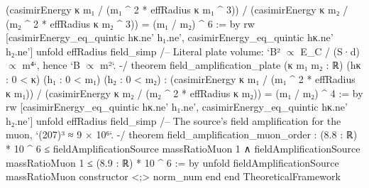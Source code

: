 \documentclass[11pt,a4paper]{article}
\begin{document}
{    (casimirEnergy κ m₁ / (m₁ \textasciicircum{} 2 * effRadius κ m₁ \textasciicircum{} 3)) /
        (casimirEnergy κ m₂ / (m₂ \textasciicircum{} 2 * effRadius κ m₂ \textasciicircum{} 3)) = (m₁ / m₂) \textasciicircum{} 6 := by
  rw [casimirEnergy\_\allowbreak{}eq\_\allowbreak{}quintic hκ.ne' h₁.ne', casimirEnergy\_\allowbreak{}eq\_\allowbreak{}quintic hκ.ne' h₂.ne']
  unfold effRadius
  field\_\allowbreak{}simp
\mbox{}
/-- Literal plate volume: `B² $\propto$ E\_\allowbreak{}C / (S·d) $\propto$ m⁴`, hence `B $\propto$ m²`. -/
theorem field\_\allowbreak{}amplification\_\allowbreak{}plate (κ m₁ m₂ : ℝ) (hκ : 0 \textless{} κ) (h₁ : 0 \textless{} m₁) (h₂ : 0 \textless{} m₂) :
    (casimirEnergy κ m₁ / (m₁ \textasciicircum{} 2 * effRadius κ m₁)) /
        (casimirEnergy κ m₂ / (m₂ \textasciicircum{} 2 * effRadius κ m₂)) = (m₁ / m₂) \textasciicircum{} 4 := by
  rw [casimirEnergy\_\allowbreak{}eq\_\allowbreak{}quintic hκ.ne' h₁.ne', casimirEnergy\_\allowbreak{}eq\_\allowbreak{}quintic hκ.ne' h₂.ne']
  unfold effRadius
  field\_\allowbreak{}simp
\mbox{}
/-- The source's field amplification for the muon, `(207)³ ≈ 9 × 10⁶`. -/
theorem field\_\allowbreak{}amplification\_\allowbreak{}muon\_\allowbreak{}order :
    (8.8 : ℝ) * 10 \textasciicircum{} 6 ≤ fieldAmplificationSource massRatioMuon 1 ∧
      fieldAmplificationSource massRatioMuon 1 ≤ (8.9 : ℝ) * 10 \textasciicircum{} 6 := by
  unfold fieldAmplificationSource massRatioMuon
  constructor \textless{};\textgreater{} norm\_\allowbreak{}num
\mbox{}
end
\mbox{}
end TheoreticalFramework
\mbox{}
}

\clearpage
\end{document}
